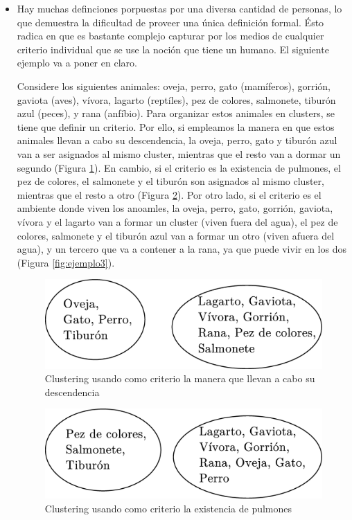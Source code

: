 \begin{itemize}

\item Hay muchas definciones porpuestas por una diversa cantidad de personas,
 lo que demuestra la dificultad de proveer una \'unica definici\'on formal. Ésto radica en que
es bastante complejo capturar por los medios de cualquier criterio individual que se 
use la noci\'on que tiene un humano. El siguiente ejemplo va a poner en claro.

Considere los siguientes animales: oveja, perro, gato (mam\'iferos), gorri\'on, gaviota (aves),
v\'ivora, lagarto (rept\'iles), pez de colores, salmonete, tibur\'on azul (peces), y rana (anf\'ibio).
Para organizar estos animales en clusters, se tiene que definir un criterio. Por ello, si 
empleamos la manera en que estos animales llevan a cabo su descendencia, la oveja, perro, gato
y tibur\'on azul van a ser asignados al mismo cluster, mientras que el resto van a dormar un segundo
(Figura \ref{fig:ejemplo1}).  En cambio, si el criterio es la existencia de pulmones, 
el pez de colores, el salmonete y el tibur\'on son
asignados al mismo cluster, mientras que el resto a otro (Figura \ref{fig:ejemplo2}).
 Por otro lado, si el criterio es el ambiente
donde viven los anoamles, la oveja, perro, gato, gorri\'on, gaviota, v\'ivora y el lagarto van a formar un cluster
(viven fuera del agua), el pez de colores, salmonete y el tibur\'on azul van a formar un otro (viven afuera
del agua), y un tercero que va a contener a la rana, ya que puede vivir en los dos (Figura \ref{fig:ejemplo3}). 

\begin{figure}[htb]
\centering
\includegraphics[scale=0.3]{figures/ejemplo1.eps}
\caption{Clustering usando como criterio la manera que llevan a cabo su descendencia}
\label{fig:ejemplo1}
\end{figure}

\begin{figure}[htb]
\centering
\includegraphics[scale=0.3]{figures/ejemplo2.eps}
\caption{Clustering usando como criterio la existencia de pulmones}
\label{fig:ejemplo2}
\end{figure}


\end{itemize}
